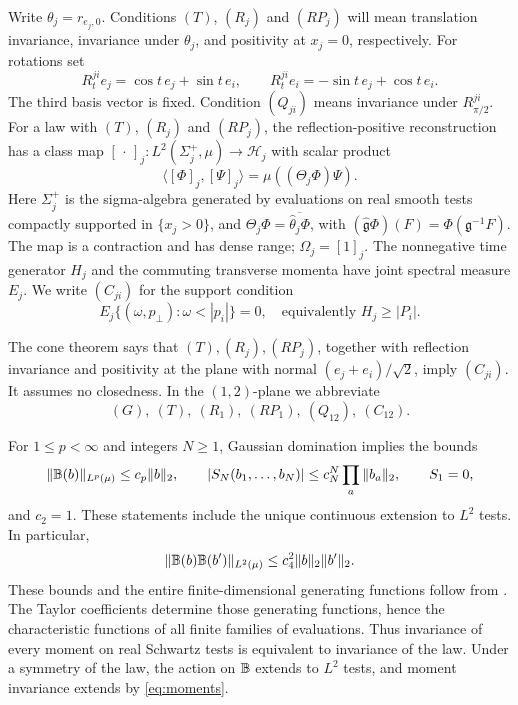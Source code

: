 \documentclass[11pt,letterpaper,reqno]{amsart}
\theoremstyle{definition}
\theoremstyle{remark}
\begin{document}
Write $\theta_j=r_{e_j,0}$. Conditions $(T)$, $(R_j)$ and $(RP_j)$
will mean translation invariance, invariance under $\theta_j$, and
positivity at $x_j=0$, respectively. For rotations set
\[
 R^{ji}_te_j=\cos t\,e_j+\sin t\,e_i,\qquad
 R^{ji}_te_i=-\sin t\,e_j+\cos t\,e_i.
\]
The third basis vector is fixed. Condition $(Q_{ji})$ means invariance
under $R^{ji}_{\pi/2}$. For a law with $(T)$, $(R_j)$ and $(RP_j)$,
the reflection-positive reconstruction has a class map
$[\,\cdot\,]_j:L^2(\Sigma_j^+,\mu)\longrightarrow\mathcal H_j$
with scalar product
\begin{equation}\label{eq:reconstructed-product}
 \langle[\Phi]_j,[\Psi]_j\rangle=\mu((\Theta_j\Phi)\Psi).
\end{equation}
Here $\Sigma_j^+$ is the sigma-algebra generated by evaluations on real
smooth tests compactly supported in $\{x_j>0\}$, and
$\Theta_j\Phi=\overline{\hat\theta_j\Phi}$, with
$(\hat{\mathfrak g}\Phi)(F)=\Phi(\mathfrak g^{-1}F)$.
The map is a contraction and has dense range; $\Omega_j=[1]_j$.
The nonnegative time generator $H_j$ and the commuting transverse
momenta have joint spectral measure $E_j$.
We write $(C_{ji})$ for the support condition
\begin{equation}\label{eq:cone}
 E_j\{(\omega,p_\perp):\omega<|p_i|\}=0,
 \quad\text{equivalently }H_j\ge|P_i|.
\end{equation}

The cone theorem \cite[Proposition~7.2]{QEDCurrent} says that
$(T),(R_j),(RP_j)$, together with reflection invariance and positivity
at the plane with normal $(e_j+e_i)/\sqrt2$, imply $(C_{ji})$.
It assumes no closedness. In the $(1,2)$-plane we abbreviate
\begin{equation}\tag{S}\label{eq:S}
 (G),\ (T),\ (R_1),\ (RP_1),\ (Q_{12}),\ (C_{12}).
\end{equation}

For $1\le p<\infty$ and integers $N\ge1$, Gaussian domination implies
the bounds
\begin{equation}\label{eq:moments}
 \|\mathbb B(b)\|_{L^p(\mu)}\le c_p\|b\|_2,\qquad
 |S_N(b_1,\ldots,b_N)|\le c_N^N\prod_a\|b_a\|_2,
 \qquad S_1=0,
\end{equation}
and $c_2=1$. These statements include the unique continuous extension
to $L^2$ tests. In particular,
\begin{equation}\label{eq:pair-bound}
 \|\mathbb B(b)\mathbb B(b')\|_{L^2(\mu)}\le c_4^2\|b\|_2\|b'\|_2.
\end{equation}
These bounds and the entire finite-dimensional generating functions
follow from \cite[Proposition~5.1]{QEDCurrent}.
The Taylor coefficients determine those generating functions, hence
the characteristic functions of all finite families of evaluations.
Thus invariance of every moment on real Schwartz tests is equivalent
to invariance of the law. Under a symmetry of the
law, the action on $\mathbb B$ extends to $L^2$ tests, and moment invariance
extends by \eqref{eq:moments}.
\end{document}
